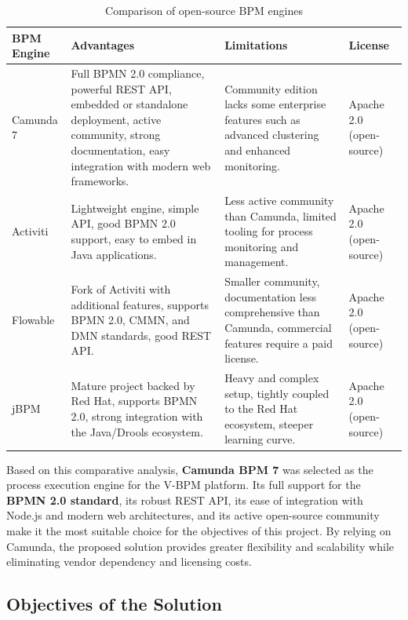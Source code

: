 \begin{table}[h!]
\centering
\caption{Comparison of open-source BPM engines}
\label{tab:tech_choice}
\renewcommand{\arraystretch}{1.5}
\begin{tabular}{|p{2.5cm}|p{4cm}|p{4cm}|p{3cm}|}
\hline
\textbf{BPM Engine} & \textbf{Advantages} & \textbf{Limitations} 
& \textbf{License} \\
\hline

Camunda 7 &
Full BPMN 2.0 compliance, powerful REST API, embedded or standalone 
deployment, active community, strong documentation, easy integration 
with modern web frameworks. &
Community edition lacks some enterprise features such as advanced 
clustering and enhanced monitoring. &
Apache 2.0 (open-source) \\
\hline

Activiti &
Lightweight engine, simple API, good BPMN 2.0 support, 
easy to embed in Java applications. &
Less active community than Camunda, limited tooling for 
process monitoring and management. &
Apache 2.0 (open-source) \\
\hline

Flowable &
Fork of Activiti with additional features, supports BPMN 2.0, 
CMMN, and DMN standards, good REST API. &
Smaller community, documentation less comprehensive than Camunda, 
commercial features require a paid license. &
Apache 2.0 (open-source) \\
\hline

jBPM &
Mature project backed by Red Hat, supports BPMN 2.0, 
strong integration with the Java/Drools ecosystem. &
Heavy and complex setup, tightly coupled to the Red Hat 
ecosystem, steeper learning curve. &
Apache 2.0 (open-source) \\
\hline

\end{tabular}
\end{table}

Based on this comparative analysis, \textbf{Camunda BPM 7} was selected as 
the process execution engine for the V-BPM platform. Its full support for the 
\textbf{BPMN 2.0 standard}, its robust REST API, its ease of integration with 
Node.js and modern web architectures, and its active open-source community 
make it the most suitable choice for the objectives of this project. By 
relying on Camunda, the proposed solution provides greater flexibility and 
scalability while eliminating vendor dependency and licensing costs.

\subsection{Objectives of the Solution}


